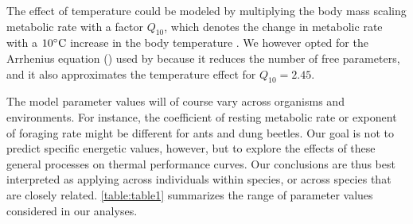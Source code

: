 The effect of temperature could be modeled by multiplying the body mass scaling metabolic rate with a factor $Q_{10}$, which denotes the change in metabolic rate with a $10^ {\circ} \rm{C}$ increase in the body temperature \citep{Precht1973}.
We however opted for the Arrhenius equation () used by \citet{Brown2004} because it reduces the number of free parameters, and it also approximates the temperature effect for $Q_{10} = 2.45$.

The model parameter values will of course vary across organisms and environments.
For instance, the coefficient of resting metabolic rate or exponent of foraging rate might be different for ants and dung beetles.
Our goal is not to predict specific energetic values, however, but to explore the effects of these general processes on thermal performance curves.
Our conclusions are thus best interpreted as applying across individuals within species, or across species that are closely related.
\cref{table:table1} summarizes the range of parameter values considered in our analyses.

